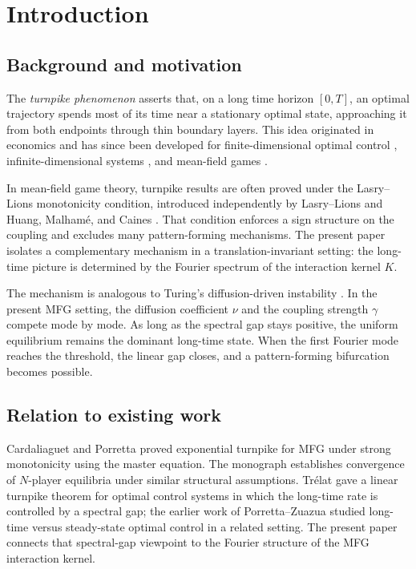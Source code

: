 \documentclass[11pt]{amsart}
\theoremstyle{definition}
\theoremstyle{remark}
\begin{document}
\section{Introduction}
\label{sec:intro}

\subsection{Background and motivation}
\label{sub:background}

The \emph{turnpike phenomenon} asserts that, on a long time horizon $[0,T]$, an optimal trajectory spends most of its time near a stationary optimal state, approaching it from both endpoints through thin boundary layers. This idea originated in economics \cite{DS58} and has since been developed for finite-dimensional optimal control \cite{PZ13,TZ15}, infinite-dimensional systems \cite{T23}, and mean-field games \cite{CaP19,CDLL19}.

In mean-field game theory, turnpike results are often proved under the Lasry--Lions monotonicity condition, introduced independently by Lasry--Lions \cite{LL07} and Huang, Malham\'e, and Caines \cite{HMC06}. That condition enforces a sign structure on the coupling and excludes many pattern-forming mechanisms. The present paper isolates a complementary mechanism in a translation-invariant setting: the long-time picture is determined by the Fourier spectrum of the interaction kernel $K$.

The mechanism is analogous to Turing's diffusion-driven instability \cite{T52}. In the present MFG setting, the diffusion coefficient $\nu$ and the coupling strength $\gamma$ compete mode by mode. As long as the spectral gap stays positive, the uniform equilibrium remains the dominant long-time state. When the first Fourier mode reaches the threshold, the linear gap closes, and a pattern-forming bifurcation becomes possible.

\subsection{Relation to existing work}
\label{sub:related}

Cardaliaguet and Porretta \cite{CaP19} proved exponential turnpike for MFG under strong monotonicity using the master equation. The monograph \cite{CDLL19} establishes convergence of $N$-player equilibria under similar structural assumptions. Tr\'elat \cite{T23} gave a linear turnpike theorem for optimal control systems in which the long-time rate is controlled by a spectral gap; the earlier work of Porretta--Zuazua \cite{PZ13} studied long-time versus steady-state optimal control in a related setting. The present paper connects that spectral-gap viewpoint to the Fourier structure of the MFG interaction kernel.
\end{document}
